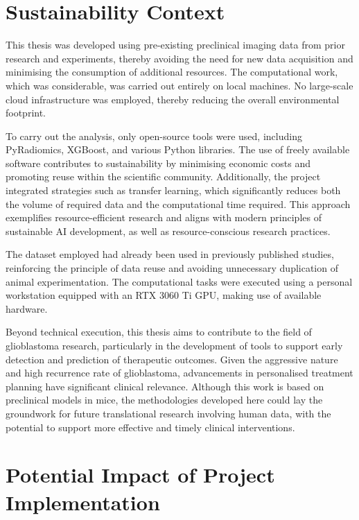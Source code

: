 \documentclass[12pt, a4paper]{report}
\begin{document}
\section{Sustainability Context}

This thesis was developed using pre-existing preclinical imaging data from prior research and experiments, thereby avoiding the need for new data acquisition and minimising the consumption of additional resources. The computational work, which was considerable, was carried out entirely on local machines. No large-scale cloud infrastructure was employed, thereby reducing the overall environmental footprint.

To carry out the analysis, only open-source tools were used, including PyRadiomics, XGBoost, and various Python libraries. The use of freely available software contributes to sustainability by minimising economic costs and promoting reuse within the scientific community. Additionally, the project integrated strategies such as transfer learning, which significantly reduces both the volume of required data and the computational time required. This approach exemplifies resource-efficient research and aligns with modern principles of sustainable AI development, as well as resource-conscious research practices.

The dataset employed had already been used in previously published studies, reinforcing the principle of data reuse and avoiding unnecessary duplication of animal experimentation. The computational tasks were executed using a personal workstation equipped with an RTX 3060 Ti GPU, making use of available hardware.

Beyond technical execution, this thesis aims to contribute to the field of glioblastoma research, particularly in the development of tools to support early detection and prediction of therapeutic outcomes. Given the aggressive nature and high recurrence rate of glioblastoma, advancements in personalised treatment planning have significant clinical relevance. Although this work is based on preclinical models in mice, the methodologies developed here could lay the groundwork for future translational research involving human data, with the potential to support more effective and timely clinical interventions.

\section{Potential Impact of Project Implementation}
\end{document}
